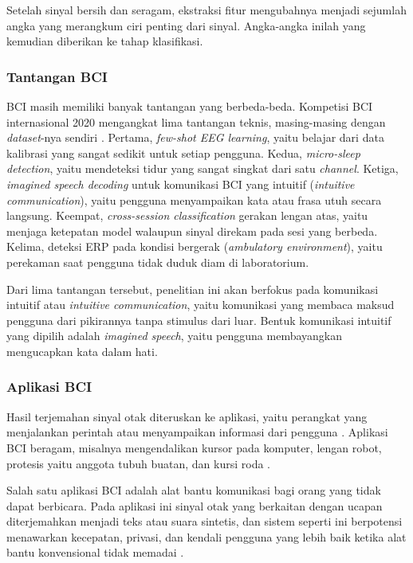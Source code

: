 Setelah sinyal bersih dan seragam, ekstraksi fitur mengubahnya menjadi sejumlah angka yang merangkum ciri penting dari sinyal.
Angka-angka inilah yang kemudian diberikan ke tahap klasifikasi.

\subsubsection{Tantangan BCI}
\label{sec:tantangan-bci}
BCI masih memiliki banyak tantangan yang berbeda-beda.
Kompetisi BCI internasional 2020 mengangkat lima tantangan teknis, masing-masing dengan \textit{dataset}-nya sendiri \parencite{jeong2022}.
Pertama, \textit{few-shot EEG learning}, yaitu belajar dari data kalibrasi yang sangat sedikit untuk setiap pengguna.
Kedua, \textit{micro-sleep detection}, yaitu mendeteksi tidur yang sangat singkat dari satu \textit{channel}.
Ketiga, \textit{imagined speech decoding} untuk komunikasi BCI yang intuitif (\textit{intuitive communication}), yaitu pengguna menyampaikan kata atau frasa utuh secara langsung.
Keempat, \textit{cross-session classification} gerakan lengan atas, yaitu menjaga ketepatan model walaupun sinyal direkam pada sesi yang berbeda.
Kelima, deteksi ERP pada kondisi bergerak (\textit{ambulatory environment}), yaitu perekaman saat pengguna tidak duduk diam di laboratorium.

Dari lima tantangan tersebut, penelitian ini akan berfokus pada komunikasi intuitif atau \textit{intuitive communication}, yaitu komunikasi yang membaca maksud pengguna dari pikirannya tanpa stimulus dari luar.
Bentuk komunikasi intuitif yang dipilih adalah \textit{imagined speech}, yaitu pengguna membayangkan mengucapkan kata dalam hati.

\subsubsection{Aplikasi BCI}
\label{sec:aplikasi-bci}
Hasil terjemahan sinyal otak diteruskan ke aplikasi, yaitu perangkat yang menjalankan perintah atau menyampaikan informasi dari pengguna \parencite{nicolasalonso2012}.
Aplikasi BCI beragam, misalnya mengendalikan kursor pada komputer, lengan robot, protesis yaitu anggota tubuh buatan, dan kursi roda \parencite{shih2012}.

Salah satu aplikasi BCI adalah alat bantu komunikasi bagi orang yang tidak dapat berbicara.
Pada aplikasi ini sinyal otak yang berkaitan dengan ucapan diterjemahkan menjadi teks atau suara sintetis, dan sistem seperti ini berpotensi menawarkan kecepatan, privasi, dan kendali pengguna yang lebih baik ketika alat bantu konvensional tidak memadai \parencite{he2026}.

